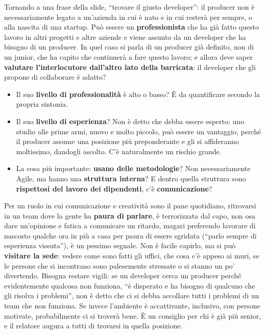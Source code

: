 Tornando a una frase della slide, ``trovare il giusto developer'': il producer
non è necessariamente legato a un'azienda in cui è nato e in cui resterà per
sempre, o alla nascita di una startup. Può essere un \textbf{professionista} che
ha già fatto questo lavoro in altri progetti e altre aziende e viene assunto da
un developer che ha bisogno di un producer. In quel caso si parla di un producer
già definito, non di un junior, che ha capito che continuerà a fare questo
lavoro; e allora deve saper \textbf{valutare l'interlocutore dall'altro lato
della barricata}: il developer che gli propone di collaborare è adatto?
\begin{itemize}
  \item Il suo \textbf{livello di professionalità} è alto o basso? È da
        quantificare secondo la propria sintonia.
  \item Il suo \textbf{livello di esperienza}? Non è detto che debba essere
        esperto: uno studio alle prime armi, nuovo e molto piccolo, può essere un
        vantaggio, perché il producer assume una posizione più preponderante e
        gli si affideranno moltissimo, dandogli ascolto. C'è naturalmente un
        rischio grande.
  \item La cosa più importante: \textbf{usano delle metodologie}? Non
        necessariamente Agile, ma hanno una \textbf{struttura interna}? E dentro
        quella struttura sono \textbf{rispettosi del lavoro dei dipendenti}, c'è
        \textbf{comunicazione}?
\end{itemize}
Per un ruolo in cui comunicazione e creatività sono il pane quotidiano,
ritrovarsi in un team dove la gente ha \textbf{paura di parlare}, è
terrorizzata dal capo, non osa dare un'opinione e fatica a comunicare un
ritardo, magari preferendo lavorare di nascosto qualche ora in più a casa per
paura di essere sgridata (``parlo sempre di esperienza vissuta''), è un pessimo
segnale. Non è facile capirlo, ma si può \textbf{visitare la sede}: vedere come
sono fatti gli uffici, che cosa c'è appeso ai muri, se le persone che si
incontrano sono palesemente stressate o si stanno un po' divertendo. Bisogna
restare vigili: se un developer cerca un producer perché evidentemente qualcosa
non funziona, ``è disperato e ha bisogno di qualcuno che gli risolva i
problemi'', non è detto che ci si debba accollare tutti i problemi di un team che
non funziona. Se invece l'ambiente è accattivante, inclusivo, con persone
motivate, probabilmente ci si troverà bene. È un consiglio per chi è già più
senior, e il relatore augura a tutti di trovarsi in quella posizione.


